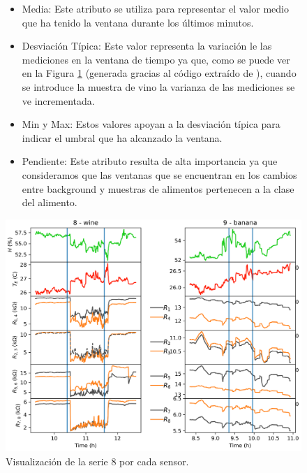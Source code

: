 \documentclass{esannV2}
\begin{document}
\begin{figure}[H]
\begin{minipage}{.55\textwidth}
    \begin{itemize}
    \item Media: Este atributo se utiliza para representar el valor medio que ha tenido la ventana durante los últimos minutos.
    \item Desviación Típica: Este valor representa la variación le las mediciones en la ventana de tiempo ya que, como se puede ver en la Figura \ref{fig:timeseries} (generada gracias al código extraído de \cite{visualizacion_series}), cuando se introduce la muestra de vino la varianza de las mediciones se ve incrementada.
    \item Min y Max: Estos valores apoyan a la desviación típica para indicar el umbral que ha alcanzado la ventana.
    \item Pendiente: Este atributo resulta de alta importancia ya que consideramos que las ventanas que se encuentran en los cambios entre background y muestras de alimentos pertenecen a la clase del alimento.
    \end{itemize}
\end{minipage}%
\quad
\begin{minipage}{.4\textwidth}
    \centering
    \includegraphics[scale=0.18,trim={1.5cm 0 33.3cm 0},clip]{figuras/justificacion_atributos_propuestos.png}
    \caption{Visualización de la serie 8 por cada sensor.}\label{fig:timeseries}
\end{minipage}%
\end{figure}
\end{document}
